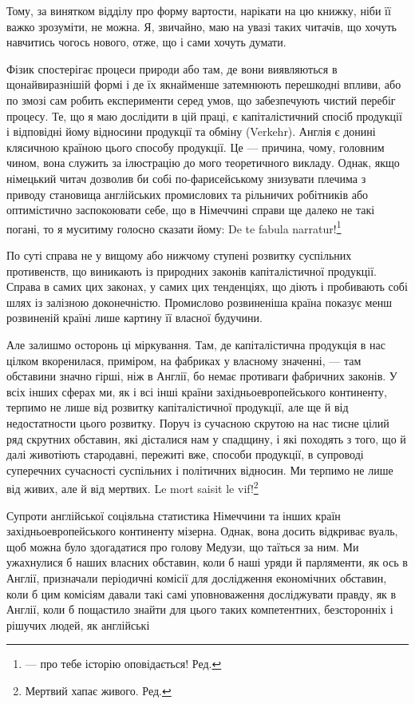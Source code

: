 Тому, за винятком відділу про форму вартости, нарікати на цю
книжку, ніби її важко зрозуміти, не можна. Я, звичайно, маю
на увазі таких читачів, що хочуть навчитись чогось нового, отже,
що і сами хочуть думати.

Фізик спостерігає процеси природи або там, де вони виявляються
в щонайвиразнішій формі і де їх якнайменше затемнюють
перешкодні впливи, або по змозі сам робить експерименти серед
умов, що забезпечують чистий перебіг процесу. Те, що я маю
дослідити в цій праці, є капіталістичний спосіб продукції і відповідні
йому відносини продукції та обміну (Verkehr). Англія
є донині клясичною країною цього способу продукції. Це —
причина, чому, головним чином, вона служить за ілюстрацію
до мого теоретичного викладу. Однак, якщо німецький читач
дозволив би собі по-фарисейському знизувати плечима з приводу
становища англійських промислових та рільничих робітників або
оптимістично заспокоювати себе, що в Німеччині справи ще далеко
не такі погані, то я муситиму голосно сказати йому: De
te fabula narratur!\footnote*{
— про тебе історію оповідається! Ред.
}

По суті справа не у вищому або нижчому ступені розвитку
суспільних противенств, що виникають із природних законів капіталістичної
продукції. Справа в самих цих законах, у самих цих
тенденціях, що діють і пробивають собі шлях із залізною доконечністю.
Промислово розвиненіша країна показує менш розвиненій
країні лише картину її власної будучини.

Але залишмо осторонь ці міркування. Там, де капіталістична
продукція в нас цілком вкоренилася, приміром, на фабриках
у власному значенні, — там обставини значно гірші, ніж в Англії,
бо немає противаги фабричних законів. У всіх інших сферах ми,
як і всі інші країни західньоевропейського континенту, терпимо
не лише від розвитку капіталістичної продукції, але ще й від
недостатности цього розвитку. Поруч із сучасною скрутою на
нас тисне цілий ряд скрутних обставин, які дісталися нам у
спадщину, і які походять з того, що й далі животіють стародавні,
пережиті вже, способи продукції, в супроводі суперечних
сучасності суспільних і політичних відносин. Ми терпимо
не лише від живих, але й від мертвих. Le mort saisit le vif!\footnote*{
Мертвий хапає живого. Ред.
}

Супроти англійської соціяльна статистика Німеччини та інших
країн західньоевропейського континенту мізерна. Однак, вона
досить відкриває вуаль, щоб можна було здогадатися про голову
Медузи, що таїться за ним. Ми ужахнулися б наших власних
обставин, коли б наші уряди й парляменти, як ось в Англії, призначали
періодичні комісії для дослідження економічних обставин,
коли б цим комісіям давали такі самі уповноваження досліджувати
правду, як в Англії, коли б пощастило знайти для цього
таких компетентних, безсторонніх і рішучих людей, як англійські
\parbreak{}  %
